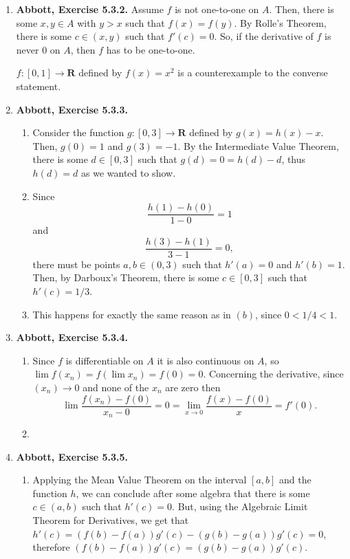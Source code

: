 \documentclass{article}
\newcommand{\R}{\mathbf{R}}
\newcommand{\exc}[2][Abbott]{\item \textbf{#1, Exercise #2.}}
\begin{document}
\begin{enumerate}
    \exc{5.3.2}
    Assume $f$ is not one-to-one on $A$. Then, there is some $x,y \in A$ with $y > x$ such that $f(x) = f(y)$. By Rolle's Theorem, there is some $c \in (x, y)$ such that $f'(c) = 0$. So, if the derivative of $f$ is never $0$ on $A$, then $f$ has to be one-to-one.
    
    $f: [0, 1] \to \R$ defined by $f(x) = x^2$ is a counterexample to the converse statement.
    
    \exc{5.3.3}
    \begin{enumerate}
        \item Consider the function $g:[0,3] \to \R$ defined by $g(x) = h(x)-x$. Then, $g(0) = 1$ and $g(3) = -1$. By the Intermediate Value Theorem, there is some $d \in [0, 3]$ such that $g(d) = 0 = h(d)-d$, thus $h(d) = d$ as we wanted to show.
        
        \item Since 
        \begin{equation*}
            \frac{h(1)-h(0)}{1-0} = 1
        \end{equation*} and 
        \begin{equation*}
            \frac{h(3)-h(1)}{3-1} = 0,
        \end{equation*} there must be points $a,b \in (0, 3)$ such that $h'(a) = 0$ and $h'(b) = 1$. Then, by Darboux's Theorem, there is some $c \in [0, 3]$ such that $h'(c) = 1/3$.
        
        \item This happens for exactly the same reason as in $(b)$, since $0 < 1/4 < 1$.
    \end{enumerate}
    
    \newpage
    \exc{5.3.4}
    \begin{enumerate}
        \item Since $f$ is differentiable on $A$ it is also continuous on $A$, so $\lim f(x_n) = f(\lim x_n) = f(0) = 0$. Concerning the derivative, since $(x_n) \to 0$ and none of the $x_n$ are zero then 
        \begin{equation*}
            \lim \frac{f(x_n)-f(0)}{x_n-0} = 0 = \lim_{x \to 0} \frac{f(x)-f(0)}{x} = f'(0).
        \end{equation*}
        
        \item 
  
    \end{enumerate}
    
    \exc{5.3.5}
    \begin{enumerate}
        \item Applying the Mean Value Theorem on the interval $[a, b]$ and the function $h$, we can conclude after some algebra that there is some $c \in (a, b)$ such that $h'(c) = 0$. But, using the Algebraic Limit Theorem for Derivatives, we get that $h'(c) = (f(b)-f(a))g'(c) - (g(b)-g(a))g'(c) = 0$, therefore $(f(b)-f(a))g'(c) = (g(b)-g(a))g'(c)$.
        

\end{enumerate}
\end{enumerate}
\end{document}
